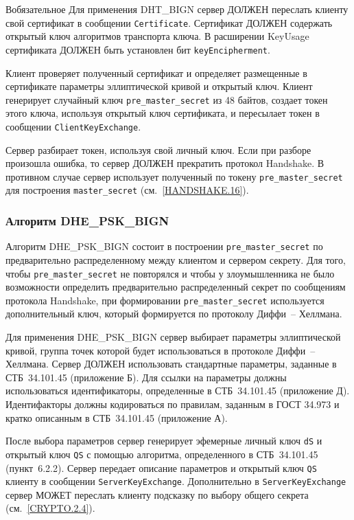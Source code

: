 \begin{appendix}{В}{обязательное}
Для применения DHT\_BIGN сервер ДОЛЖЕН переслать клиенту свой сертификат в 
сообщении \lstinline{Certificate}. Сертификат ДОЛЖЕН содержать открытый ключ 
алгоритмов транспорта ключа. В расширении KeyUsage сертификата ДОЛЖЕН быть 
установлен бит \lstinline{keyEncipherment}. 

Клиент проверяет полученный сертификат и определяет размещенные в 
сертификате параметры эллиптической кривой и открытый ключ. Клиент 
генерирует случайный ключ \lstinline{pre_master_secret} из 48 байтов, 
создает токен этого ключа, используя открытый ключ сертификата, и 
пересылает токен в сообщении \lstinline{ClientKeyExchange}.  

Сервер разбирает токен, используя свой личный ключ. Если при разборе 
произошла ошибка, то сервер ДОЛЖЕН прекратить протокол Handshake. В 
противном случае сервер использует полученный по токену 
\lstinline{pre_master_secret} для построения \lstinline{master_secret} 
(см.~\ref{HANDSHAKE.16}).  

\subsubsection{Алгоритм DHE\_PSK\_BIGN}\label{BSUITES.2.3.3}

Алгоритм DHE\_PSK\_BIGN состоит в построении \lstinline{pre_master_secret} по 
предварительно распределенному между клиентом и сервером секрету. Для 
того, чтобы \lstinline{pre_master_secret} не повторялся и чтобы у злоумышленника не 
было возможности определить предварительно распределенный секрет по 
сообщениям протокола Handshake, при формировании 
\lstinline{pre_master_secret} используется дополнительный ключ, который 
формируется по протоколу Диффи~-- Хеллмана.  

Для применения DHE\_PSK\_BIGN сервер выбирает параметры эллиптической 
кривой, группа точек которой будет использоваться в протоколе Диффи~-- 
Хеллмана. Сервер ДОЛЖЕН использовать стандартные параметры, заданные в 
СТБ~34.101.45 (приложение Б). Для ссылки на параметры должны использоваться  
идентификаторы, определенные в СТБ~34.101.45 (приложение Д). Идентифакторы 
должны кодироваться по правилам, заданным в ГОСТ 34.973 и кратко описанным 
в СТБ~34.101.45 (приложение А). 

После выбора параметров сервер генерирует эфемерные личный ключ \lstinline{dS} и 
открытый ключ \lstinline{QS} с помощью алгоритма, определенного в СТБ~34.101.45 
(пункт~6.2.2). Сервер передает описание параметров и открытый ключ 
\lstinline{QS} клиенту в сообщении \lstinline{ServerKeyExchange}. 
Дополнительно в \lstinline{ServerKeyExchange} сервер МОЖЕТ переслать 
клиенту подсказку по выбору общего секрета (см.~\ref{CRYPTO.2.4}).   


\end{appendix}
